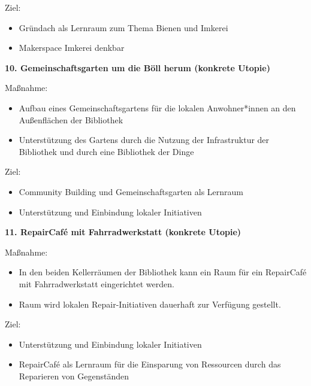 \documentclass[a4paper,
fontsize=11pt,
oneside,
numbers=noperiodatend,
parskip=half-,
bibliography=totoc,
final
]{scrartcl}
\begin{document}
Ziel:

\begin{itemize}[itemsep=-5pt]

\item
  Gründach als Lernraum zum Thema Bienen und Imkerei
\item
  Makerspace Imkerei denkbar
\end{itemize}

\textbf{10. Gemeinschaftsgarten um die Böll herum (konkrete Utopie)}

Maßnahme:

\begin{itemize}[itemsep=-5pt]

\item
  Aufbau eines Gemeinschaftsgartens für die lokalen Anwohner*innen an
  den Außenflächen der Bibliothek
\item
  Unterstützung des Gartens durch die Nutzung der Infrastruktur der
  Bibliothek und durch eine Bibliothek der Dinge
\end{itemize}

Ziel:

\begin{itemize}[itemsep=-5pt]

\item
  Community Building und Gemeinschaftsgarten als Lernraum
\item
  Unterstützung und Einbindung lokaler Initiativen
\end{itemize}

\textbf{11. RepairCafé mit Fahrradwerkstatt (konkrete Utopie)}

Maßnahme:

\begin{itemize}[itemsep=-5pt]

\item
  In den beiden Kellerräumen der Bibliothek kann ein Raum für ein
  RepairCafé mit Fahrradwerkstatt eingerichtet werden.
\item
  Raum wird lokalen Repair-Initiativen dauerhaft zur Verfügung gestellt.
\end{itemize}

Ziel:

\begin{itemize}[itemsep=-5pt]

\item
  Unterstützung und Einbindung lokaler Initiativen
\item
  RepairCafé als Lernraum für die Einsparung von Ressourcen durch das
  Reparieren von Gegenständen
\end{itemize}
\end{document}
